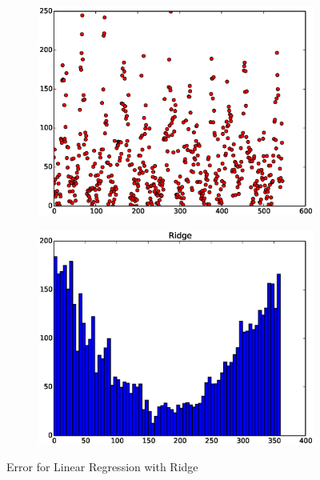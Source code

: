 \documentclass{article}
\begin{document}
\begin{figure}[H]
  \begin{subfigure}[!h]{0.5\textwidth}
    \centering
    \includegraphics[width=\textwidth]{./woodley/Ridge_heading_plot.eps}
    \label{img:woodley_sample}
  \end{subfigure}
  \begin{subfigure}[!h]{0.5\textwidth}
    \centering
    \includegraphics[width=\textwidth]{./woodley/Ridge_heading_bar.eps}
    \label{img:woodley_features}
  \end{subfigure}
  \caption{Error for Linear Regression with Ridge}
\end{figure}
\end{document}
